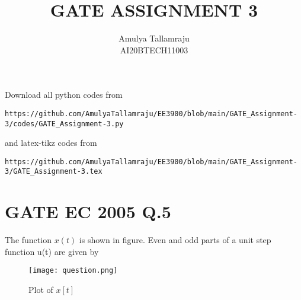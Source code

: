 \documentclass[journal,12pt,twocolumn]{IEEEtran}
\begin{document}
     \def\centbox#1{\makebox[0in]{#1}}
     \def\topbox#1{\raisebox{-\baselineskip}[0in][0in]{#1}}
     \def\midbox#1{\raisebox{-0.5\baselineskip}[0in][0in]{#1}}
\vspace{3cm}
\title{GATE ASSIGNMENT 3}
\author{Amulya Tallamraju \\ AI20BTECH11003}
\maketitle
\newpage
\bigskip
\renewcommand{\thefigure}{\theenumi}
\renewcommand{\thetable}{\theenumi}
Download all python codes from 
\begin{lstlisting}
https://github.com/AmulyaTallamraju/EE3900/blob/main/GATE_Assignment-3/codes/GATE_Assignment-3.py
\end{lstlisting}
%
and latex-tikz codes from 
%
\begin{lstlisting}
https://github.com/AmulyaTallamraju/EE3900/blob/main/GATE_Assignment-3/GATE_Assignment-3.tex
\end{lstlisting}
%
\section{GATE EC 2005 Q.5}
The function $x(t)$ is shown in figure. Even and odd parts of a unit step function u(t) are given by
\begin{figure}[!ht]
         \centering
         \texttt{[image: question.png]}
         \caption{Plot of $x[t]$}
         \label{plot}
\end{figure}
\end{document}
